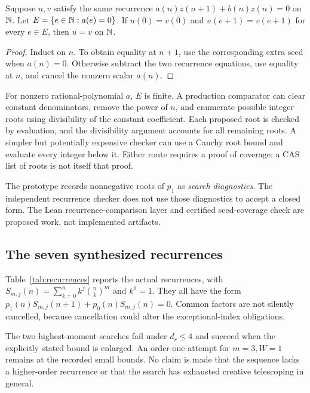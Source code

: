 \begin{proposition}\label{prop:seeds}
Suppose $u,v$ satisfy the same recurrence
$a(n)z(n+1)+b(n)z(n)=0$ on $\mathbb N$. Let
$E=\{e\in\mathbb N:a(e)=0\}$. If $u(0)=v(0)$ and
$u(e+1)=v(e+1)$ for every $e\in E$, then $u=v$ on $\mathbb N$.
\end{proposition}
\begin{proof}
Induct on $n$. To obtain equality at $n+1$, use the corresponding extra seed
when $a(n)=0$. Otherwise subtract the two recurrence equations, use equality at
$n$, and cancel the nonzero scalar $a(n)$.
\end{proof}

For nonzero rational-polynomial $a$, $E$ is finite. A production comparator can
clear constant denominators, remove the power of $n$, and enumerate possible
integer roots using divisibility of the constant coefficient. Each proposed
root is checked by evaluation, and the divisibility argument accounts for all
remaining roots. A simpler but potentially expensive checker can use a Cauchy
root bound and evaluate every integer below it. Either route requires a proof
of coverage; a CAS list of roots is not itself that proof.

The prototype records nonnegative roots of $p_1$ as \emph{search diagnostics}.
The independent recurrence checker does not use those diagnostics to accept a
closed form. The Lean recurrence-comparison layer and certified seed-coverage
check are proposed work, not implemented artifacts.

\subsection{The seven synthesized recurrences}

Table~\ref{tab:recurrences} reports the actual recurrences, with
$S_{m,j}(n)=\sum_{k=0}^n k^j\binom nk^m$ and $k^0=1$. They all have the form
$p_1(n)S_{m,j}(n+1)+p_0(n)S_{m,j}(n)=0$. Common factors are not silently
cancelled, because cancellation could alter the exceptional-index obligations.

\begingroup\small

\endgroup


The two highest-moment searches fail under $d_r\le4$ and succeed when the
explicitly stated bound is enlarged. An order-one attempt for $m=3,W=1$ remains
\Unknown at the recorded small bounds. No claim is made that the sequence lacks
a higher-order recurrence or that the search has exhausted creative telescoping
in general.

